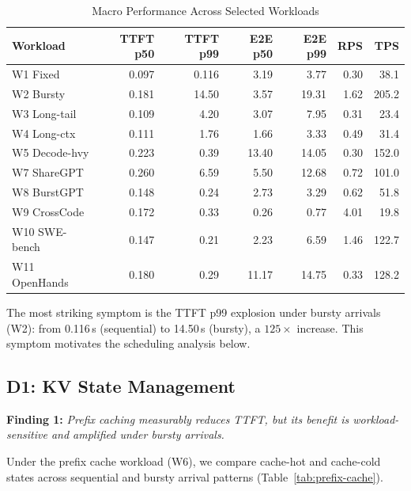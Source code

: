 \documentclass[conference]{IEEEtran}
\begin{document}
\begin{table}[htbp]
\caption{Macro Performance Across Selected Workloads}
\label{tab:macro}
\begin{center}
\small
\begin{tabular}{@{}lrrrrrr@{}}
\toprule
\textbf{Workload} & \textbf{TTFT p50} & \textbf{TTFT p99} & \textbf{E2E p50} & \textbf{E2E p99} & \textbf{RPS} & \textbf{TPS} \\
\midrule
W1 Fixed        & 0.097 & 0.116 & 3.19  & 3.77  & 0.30 & 38.1  \\
W2 Bursty       & 0.181 & 14.50 & 3.57  & 19.31 & 1.62 & 205.2 \\
W3 Long-tail    & 0.109 & 4.20  & 3.07  & 7.95  & 0.31 & 23.4  \\
W4 Long-ctx     & 0.111 & 1.76  & 1.66  & 3.33  & 0.49 & 31.4  \\
W5 Decode-hvy   & 0.223 & 0.39  & 13.40 & 14.05 & 0.30 & 152.0 \\
W7 ShareGPT     & 0.260 & 6.59  & 5.50  & 12.68 & 0.72 & 101.0 \\
W8 BurstGPT     & 0.148 & 0.24  & 2.73  & 3.29  & 0.62 & 51.8  \\
W9 CrossCode    & 0.172 & 0.33  & 0.26  & 0.77  & 4.01 & 19.8  \\
W10 SWE-bench   & 0.147 & 0.21  & 2.23  & 6.59  & 1.46 & 122.7 \\
W11 OpenHands   & 0.180 & 0.29  & 11.17 & 14.75 & 0.33 & 128.2 \\
\bottomrule
\end{tabular}
\end{center}
\end{table}

The most striking symptom is the TTFT p99 explosion under bursty arrivals
(W2): from 0.116\,s (sequential) to 14.50\,s (bursty), a $125\times$
increase. This symptom motivates the scheduling analysis below.

\subsection{D1: KV State Management}
\label{sec:kv-state}

\textbf{Finding 1:} \emph{Prefix caching measurably reduces TTFT, but its
benefit is workload-sensitive and amplified under bursty arrivals.}

Under the prefix cache workload (W6), we compare cache-hot and cache-cold
states across sequential and bursty arrival patterns
(Table~\ref{tab:prefix-cache}).
\end{document}
